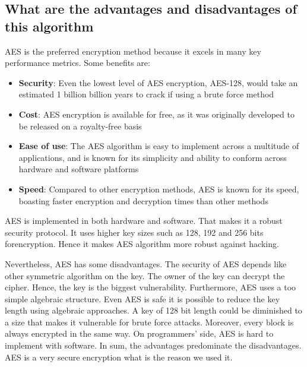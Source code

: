 \documentclass[]{article}
\begin{document}
\subsection{What are the advantages and disadvantages of this algorithm}
AES is the preferred encryption method because it excels in many key performance metrics. Some benefits are:
\begin{itemize}
    \item \textbf{Security}: Even the lowest level of AES encryption, AES-128, would take an estimated 1 billion billion years 
    to crack if using a brute force method
    \item \textbf{Cost}: AES encryption is available for free, as it was originally developed to be released on a royalty-free basis
    \item \textbf{Ease of use}: The AES algorithm is easy to implement across a multitude of applications, and is known for its 
    simplicity and ability to conform across hardware and software platforms
    \item \textbf{Speed}: Compared to other encryption methods, AES is known for its speed, boasting faster encryption and 
    decryption times than other methods
\end{itemize}
\cite{panda}
AES is implemented in both hardware and software. That makes it a robust security protocol. It uses higher key sizes such as
128, 192 and 256 bits forencryption. Hence it makes AES algorithm more robust against hacking.


Nevertheless, AES has some disadvantages. The security of AES depends like other symmetric algorithm on the key. The owner
of the key can decrypt the cipher. Hence, the key is the biggest vulnerability. Furthermore, AES uses a too simple
algebraic structure. Even AES is safe it is possible to reduce the key length using algebraic approaches. A key of 128 bit 
length could be diminished to a size that makes it vulnerable for brute force attacks. Moreover, every block is always 
encrypted in the same way. On programmers' side, AES is hard to implement with software.
\noindent
In sum, the advantages predominate the disadvantages. AES is a very secure encryption what is the reason we used it.
\end{document}

